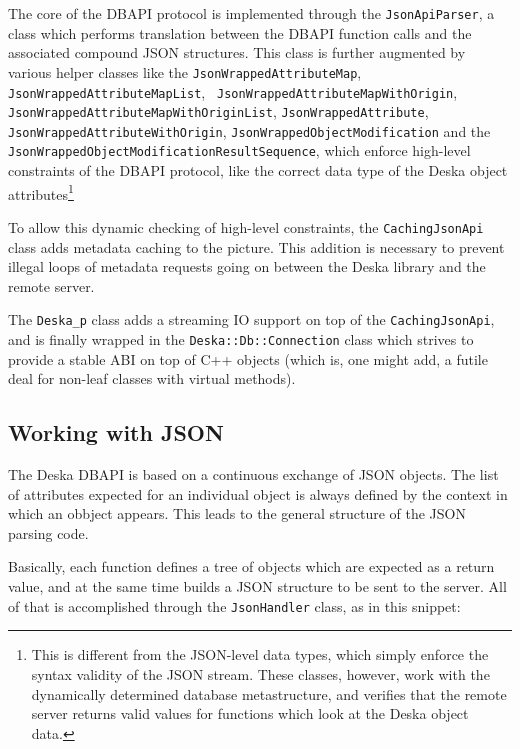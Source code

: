 \documentclass[deska]{subfiles}
\begin{document}
The core of the DBAPI protocol is implemented through the {\tt JsonApiParser}, a class which performs translation
between the DBAPI function calls and the associated compound JSON structures.  This class is further augmented by
various helper classes like the {\tt JsonWrappedAttributeMap}, {\tt JsonWrappedAttributeMapList}, {\tt
JsonWrappedAttributeMapWithOrigin}, {\tt JsonWrappedAttributeMapWithOriginList}, {\tt JsonWrappedAttribute}, {\tt
JsonWrappedAttributeWithOrigin}, {\tt JsonWrappedObjectModification} and the {\tt
JsonWrappedObjectModificationResultSequence}, which enforce high-level constraints of the DBAPI protocol, like the
correct data type of the Deska object attributes\footnote{This is different from the JSON-level data types, which simply
enforce the syntax validity of the JSON stream.  These classes, however, work with the dynamically determined database
metastructure, and verifies that the remote server returns valid values for functions which look at the Deska object
data.}

To allow this dynamic checking of high-level constraints, the {\tt CachingJsonApi} class adds metadata caching to the
picture.  This addition is necessary to prevent illegal loops of metadata requests going on between the Deska library
and the remote server.

The {\tt Deska\_p} class adds a streaming IO support on top of the {\tt CachingJsonApi}, and is finally wrapped in the
{\tt Deska::Db::Connection} class which strives to provide a stable ABI on top of C++ objects (which is, one might add,
a futile deal for non-leaf classes with virtual methods).

\subsection{Working with JSON}

The Deska DBAPI is based on a continuous exchange of JSON objects.  The list of attributes expected for an individual
object is always defined by the context in which an obbject appears.  This leads to the general structure of the JSON
parsing code.

Basically, each function defines a tree of objects which are expected as a return value, and at the same time builds a
JSON structure to be sent to the server.  All of that is accomplished through the {\tt JsonHandler} class, as in this
snippet:
\end{document}
